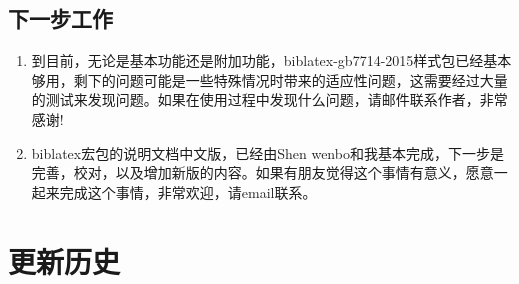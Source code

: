 \subsection{下一步工作}

\begin{enumerate}
  \item 到目前，无论是基本功能还是附加功能，biblatex-gb7714-2015样式包已经基本够用，剩下的问题可能是一些特殊情况时带来的适应性问题，这需要经过大量的测试来发现问题。如果在使用过程中发现什么问题，请邮件联系作者，非常感谢!






  \item biblatex宏包的说明文档中文版，已经由Shen wenbo和我基本完成，下一步是完善，校对，以及增加新版的内容。如果有朋友觉得这个事情有意义，愿意一起来完成这个事情，非常欢迎，请email联系。


\end{enumerate}

\section{更新历史}






